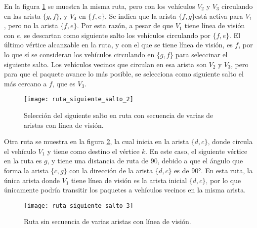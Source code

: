 En la figura \ref{fig:ruta_siguiente_salto_2} se muestra la misma ruta, pero
con los vehículos $V_2$ y $V_3$ circulando en las arista $\{g,f\}$, y $V_4$ en
$\{f,e\}$. Se indica que la arista $\{f,g\}$está activa para $V_1$,
pero no la arista $\{f,e\}$. Por esta razón, a pesar de que $V_1$ tiene línea
de visión con $e$, se descartan como siguiente salto los vehículos circulando
por $\{f,e\}$. El último vértice alcanzable en la ruta, y con el que se tiene
línea de visión, es $f$, por lo que sí se consideran los vehículos circulando
en $\{g,f\}$ para seleccinar el siguiente salto. Los vehículos vecinos que
circulan en esa arista son $V_2$ y $V_3$, pero para que el paquete avance lo
más posible, se selecciona como siguiente salto el más cercano a $f$, que es
$V_3$.

\begin{figure}[th!]
\centering
\texttt{[image: ruta\_siguiente\_salto\_2]}
\decoRule
\caption[Selección del siguiente salto en ruta con secuencia de varias de
aristas con línea de visión]{Selección del siguiente salto en ruta con
secuencia de varias de aristas con línea de visión.}
\label{fig:ruta_siguiente_salto_2}
\end{figure}

Otra ruta se muestra en la figura \ref{fig:ruta_siguiente_salto_3}, la cual
inicia en la arista $\{d,c\}$, donde circula el vehículo $V_1$ y tiene como
destino el vértice $k$. En este caso, el siguiente vértice en la ruta es $g$, y
tiene una distancia de ruta de 90, debido a que el ángulo que forma la arista
$\{c,g\}$ con la dirección de la arista $\{d,c\}$ es de 90\si{\degree}. En esta ruta, la
única arista donde $V_1$ tiene línea de visión es la arista inicial $\{d,c\}$,
por lo que únicamente podría transitir los paquetes a vehículos vecinos en la
misma arista.

\begin{figure}[th!]
\centering
\texttt{[image: ruta\_siguiente\_salto\_3]}
\decoRule
\caption[Ruta sin secuencia de varias aristas con línea de visión]{Ruta sin
secuencia de varias aristas con línea de visión.}
\label{fig:ruta_siguiente_salto_3}
\end{figure}


